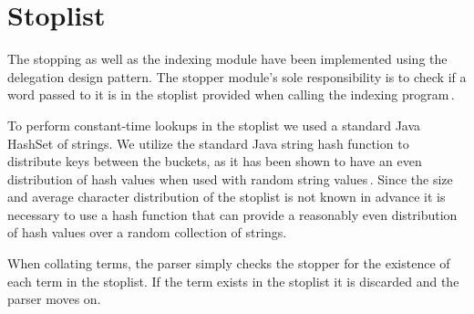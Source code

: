 
\section{Stoplist}
\label{sec:stopping}

The stopping as well as the indexing module have been implemented using the delegation design pattern. The stopper module's sole responsibility is to check if a word passed to it is in the stoplist provided when calling the indexing program\,\cite{princeton}.

To perform constant-time lookups in the stoplist we used a standard Java HashSet of strings. We utilize the standard Java string hash function to distribute keys between the buckets, as it has been shown to have an even distribution of hash values when used with random string values\,\cite{javamex}. Since the size and average character distribution of the stoplist is not known in advance it is necessary to use a hash function that can provide a reasonably even distribution of hash values over a random collection of strings.

When collating terms, the parser simply checks the stopper for the existence of each term in the stoplist. If the term exists in the stoplist it is discarded and the parser moves on.